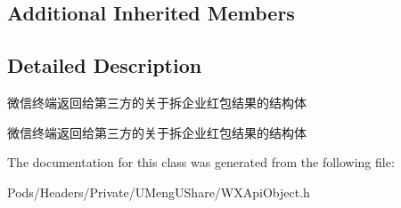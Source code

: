 \subsection*{Additional Inherited Members}


\subsection{Detailed Description}
微信终端返回给第三方的关于拆企业红包结果的结构体 

微信终端返回给第三方的关于拆企业红包结果的结构体 

The documentation for this class was generated from the following file\+:\begin{DoxyCompactItemize}
\item 
Pods/\+Headers/\+Private/\+U\+Meng\+U\+Share/W\+X\+Api\+Object.\+h\end{DoxyCompactItemize}
